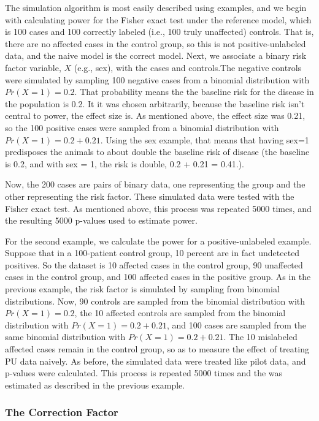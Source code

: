 \documentclass[
]{article}
\begin{document}
The simulation algorithm is most easily described using examples, and we
begin with calculating power for the Fisher exact test under the
reference model, which is 100 cases and 100 correctly labeled (i.e., 100
truly unaffected) controls. That is, there are no affected cases in the
control group, so this is not positive-unlabeled data, and the naive
model is the correct model. Next, we associate a binary risk factor
variable, \(X\) (e.g., sex), with the cases and controls.The negative
controls were simulated by sampling 100 negative cases from a binomial
distribution with \(Pr(X=1) = 0.2\). That probability means the the
baseline risk for the disease in the population is 0.2. It it was chosen
arbitrarily, because the baseline risk isn't central to power, the
effect size is. As mentioned above, the effect size was 0.21, so the 100
positive cases were sampled from a binomial distribution with
\(Pr(X=1) = 0.2 + 0.21\). Using the sex example, that means that having
sex=1 predisposes the animals to about double the baseline risk of
disease (the baseline is 0.2, and with sex = 1, the risk is double, 0.2
+ 0.21 = 0.41.).

Now, the 200 cases are pairs of binary data, one representing the group
and the other representing the risk factor. These simulated data were
tested with the Fisher exact test. As mentioned above, this process was
repeated 5000 times, and the resulting 5000 p-values used to estimate
power.

For the second example, we calculate the power for a positive-unlabeled
example. Suppose that in a 100-patient control group, 10 percent are in
fact undetected positives. So the dataset is 10 affected cases in the
control group, 90 unaffected cases in the control group, and 100
affected cases in the positive group. As in the previous example, the
risk factor is simulated by sampling from binomial distributions. Now,
90 controls are sampled from the binomial distribution with
\(Pr(X=1) = 0.2\), the 10 affected controls are sampled from the
binomial distribution with \(Pr(X=1) = 0.2+ 0.21\), and 100 cases are
sampled from the same binomial distribution with
\(Pr(X=1) = 0.2 + 0.21\). The 10 mislabeled affected cases remain in the
control group, so as to measure the effect of treating PU data naively.
As before, the simulated data were treated like pilot data, and p-values
were calculated. This process is repeated 5000 times and the was
estimated as described in the previous example.

\hypertarget{the-correction-factor}{%
\subsubsection{The Correction Factor}\label{the-correction-factor}}
\end{document}
